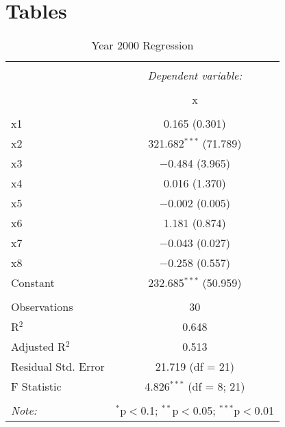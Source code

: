 \documentclass[12pt,english]{article}
\begin{document}
\section{Tables}
 \begin{table}[!htbp]
  \centering 
  \caption{Year 2000 Regression} 
  \label{} 
\begin{tabular}{@{\extracolsep{1pt}}lc} 
\\[-1.8ex]\hline 
\hline \\[-1.8ex] 
 & \multicolumn{1}{c}{\textit{Dependent variable:}} \\ 
\cline{2-2} 
\\[-1.8ex] & x \\ 
\hline \\[-1.8ex] 
 x1 & 0.165 (0.301) \\ 
  x2 & 321.682$^{***}$ (71.789) \\ 
  x3 & $-$0.484 (3.965) \\ 
  x4 & 0.016 (1.370) \\ 
  x5 & $-$0.002 (0.005) \\ 
  x6 & 1.181 (0.874) \\ 
  x7 & $-$0.043 (0.027) \\ 
  x8 & $-$0.258 (0.557) \\ 
  Constant & 232.685$^{***}$ (50.959) \\ 
 \hline \\[-1.8ex] 
Observations & 30 \\ 
R$^{2}$ & 0.648 \\ 
Adjusted R$^{2}$ & 0.513 \\ 
Residual Std. Error & 21.719 (df = 21) \\ 
F Statistic & 4.826$^{***}$ (df = 8; 21) \\ 
\hline 
\hline \\[-1.8ex] 
\textit{Note:}  & \multicolumn{1}{r}{$^{*}$p$<$0.1; $^{**}$p$<$0.05; $^{***}$p$<$0.01} \\ 
\end{tabular} 
\end{table}
\newpage
\end{document}
